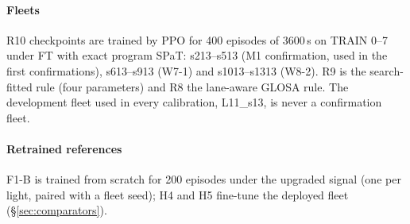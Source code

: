 \paragraph{Fleets} R10 checkpoints are trained by PPO for 400 episodes of 3600\,s on TRAIN 0--7 under FT with exact program SPaT: s213--s513
(M1 confirmation, used in the first confirmations), s613--s913 (W7-1) and s1013--s1313 (W8-2). R9 is the search-fitted rule
(four parameters) and R8 the lane-aware GLOSA rule. The development fleet used in every calibration, L11\_s13, is never a confirmation
fleet.
\paragraph{Retrained references} F1-B is trained from scratch for 200 episodes under the upgraded signal (one per light, paired with a
fleet seed); H4 and H5 fine-tune the deployed fleet (§\ref{sec:comparators}).

